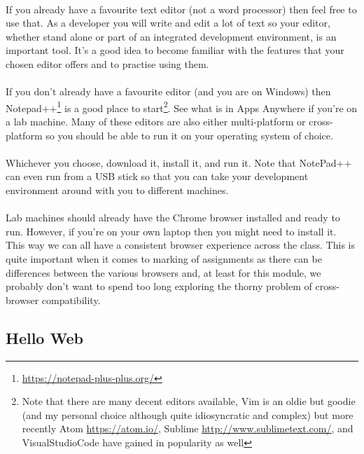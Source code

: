 \documentclass[10pt, a4paper]{article}
\begin{document}
\paragraph{} If you already have a favourite text editor (not a word processor) then feel free to use that. As a developer you will write and edit a lot of text so your editor, whether stand alone or part of an integrated development environment, is an important tool. It's a good idea to become familiar with the features that your chosen editor offers and to practise using them.

\paragraph{} If you don't already have a favourite editor (and you are on Windows) then Notepad++\footnote{\url{https://notepad-plus-plus.org/}} is a good place to start\footnote{Note that there are many decent editors available, Vim is an oldie but goodie (and my personal choice although quite idiosyncratic and complex) but more recently Atom \url{https://atom.io/}, Sublime \url{http://www.sublimetext.com/}, and VisualStudioCode \url{} have gained in popularity as well}. See what is in Apps Anywhere if you're on a lab machine. Many of these editors are also either multi-platform or cross-platform so you should be able to run it on your operating system of choice.

\paragraph{} Whichever you choose, download it, install it, and run it. Note that NotePad++ can even run from a USB stick so that you can take your development environment around with you to different machines.

\paragraph{} Lab machines should already have the Chrome browser installed and ready to run. However, if you're on your own laptop then you might need to install it. This way we can all have a consistent browser experience across the class. This is quite important when it comes to marking of assignments as there can be differences between the various browsers and, at least for this module, we probably don't want to spend too long exploring the thorny problem of cross-browser compatibility.

\subsection{Hello Web}
\end{document}
